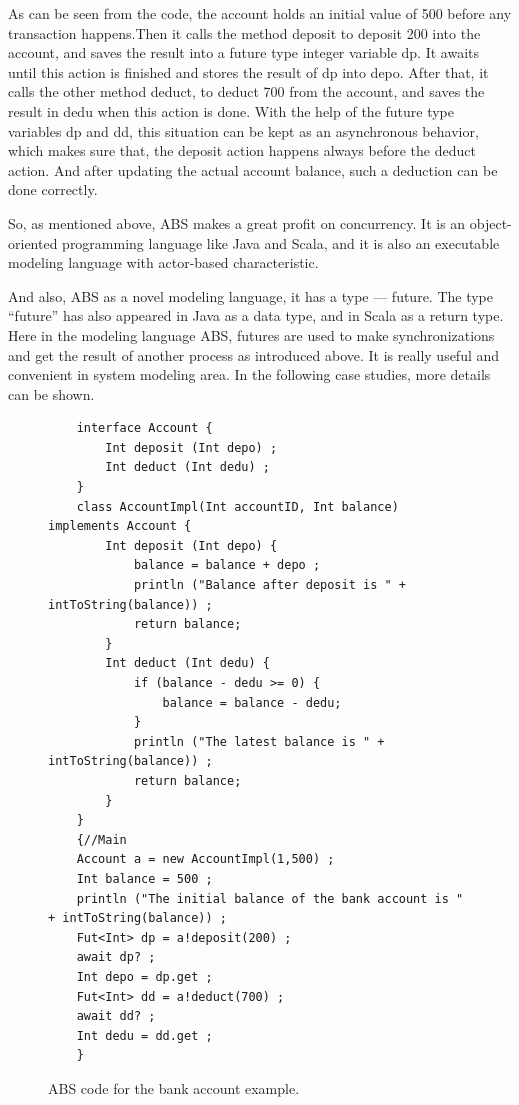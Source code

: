 \documentclass[article,dr=phil,type=msc,colorback,accentcolor=tud9c]{tudthesis}
\begin{document}
  As can be seen from the code, the account holds an initial value of 500 before any transaction happens.Then it calls the method deposit to deposit 200 into the account, and saves the result into a future type integer variable dp. It awaits until this action is finished and stores the result of dp into depo. After that, it calls the other method deduct, to deduct 700 from the account, and saves the result in dedu when this action is done. With the help of the future type variables dp and dd, this situation can be kept as an asynchronous behavior, which makes sure that, the deposit action happens always before the deduct action. And after updating the actual account balance, such a deduction can be done correctly.

  So, as mentioned above, ABS makes a great profit on concurrency. It is an object-oriented programming language like Java and Scala, and it is also an executable modeling language with actor-based characteristic.

  And also, ABS as a novel modeling language, it has a type --- future. The type ``future'' has also appeared in Java as a data type, and in Scala as a return type. Here in the modeling language ABS, futures are used to make synchronizations and get the result of another process as introduced above. It is really useful and convenient in system modeling area. In the following case studies, more details can be shown.
  
  \begin{figure}[H]
  	\begin{lstlisting}
  	interface Account {
  		Int deposit (Int depo) ;  
  		Int deduct (Int dedu) ;  	
  	}  	
  	class AccountImpl(Int accountID, Int balance) implements Account {
  		Int deposit (Int depo) {
  			balance = balance + depo ; 
  			println ("Balance after deposit is " + intToString(balance)) ;
  			return balance;
  		}
	  	Int deduct (Int dedu) {
  			if (balance - dedu >= 0) { 
  				balance = balance - dedu; 
  			}
  			println ("The latest balance is " + intToString(balance)) ;
		  	return balance;
  		}
  	}
  	{//Main
  	Account a = new AccountImpl(1,500) ;
  	Int balance = 500 ;  	
  	println ("The initial balance of the bank account is " + intToString(balance)) ;  	
  	Fut<Int> dp = a!deposit(200) ;
  	await dp? ;
  	Int depo = dp.get ;  	
  	Fut<Int> dd = a!deduct(700) ; 
  	await dd? ;
  	Int dedu = dd.get ;  	
  	}\end{lstlisting}
  	\caption[Caption for LOF]{ABS code for the bank account example.}
  \end{figure}
  
\end{document}
